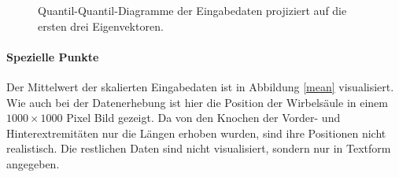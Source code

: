  \begin{figure}
  \qquad
  \qquad
  
  \caption{Quantil-Quantil-Diagramme der Eingabedaten projiziert auf die ersten drei Eigenvektoren.}
  \label{qqdiagram_projections}
 \end{figure}
 
 
 \paragraph{Spezielle Punkte}
 Der Mittelwert der skalierten Eingabedaten ist in Abbildung \ref{mean} visualisiert.
 Wie auch bei der Datenerhebung ist hier die Position der Wirbelsäule in einem $1000 \times 1000$ Pixel Bild gezeigt. Da von den Knochen der Vorder- und Hinterextremitäten nur die Längen erhoben wurden, sind ihre Positionen nicht realistisch. Die restlichen Daten sind nicht visualisiert, sondern nur in Textform angegeben.
 
